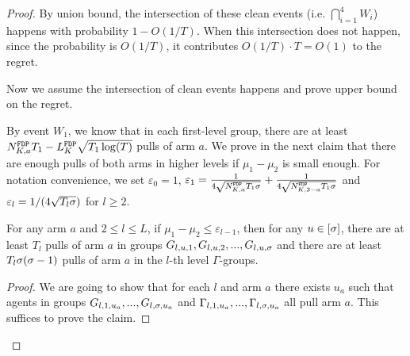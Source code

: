 \begin{proof}
By union bound, the intersection of these clean events (i.e. $\bigcap_{i=1}^4 W_i$) happens with probability $1-O(1/T)$. When this intersection does not happen, since the probability is $O(1/T)$, it contributes $O(1/T) \cdot T = O(1)$ to the regret. 

Now we assume the intersection of clean events happens and prove upper bound on the regret.

By event $W_1$, we know that in each first-level group, there are at least $\fdpN T_1- \GdT \sqrt{T_1\log(T)}$ pulls of arm $a$. We prove in the next claim that there are enough pulls of both arms in higher levels if $\mu_1-\mu_2$ is small enough. For notation convenience, we set $\varepsilon_0 = 1$, $\varepsilon_1 = \frac{1}{4\sqrt{\fdpN T_1\NG}} + \frac{1}{4\sqrt{\fdpN[3-a] T_1\NG}}$ and $\varepsilon_l = 1/(4\sqrt{T_l\NG})$ for $l \geq 2$. 

\begin{claim}
\label{clm:l2_explore}
For any arm $a$ and $2\leq l \leq L$, if $\mu_1 - \mu_2 \leq \varepsilon_{l-1}$, then for any $u \in [\NG]$, there are at least $T_l$ pulls of arm $a$ in groups $G_{l,u,1},G_{l,u,2}, ... ,G_{l,u,\NG}$ and there are at least $T_l\NG(\NG-1)$ pulls of arm $a$ in the $l$-th level $\Gamma$-groups.
\end{claim}

\begin{proof}
We are going to show that for each $l$ and arm $a$ there exists $u_a$ such that agents in groups $G_{l,1,u_a},...,G_{l,\NG,u_a}$ and $\Gamma_{l,1,u_a},...,\Gamma_{l,\NG,u_a}$ all pull arm $a$. This suffices to prove the claim.


\end{proof}
\end{proof}
